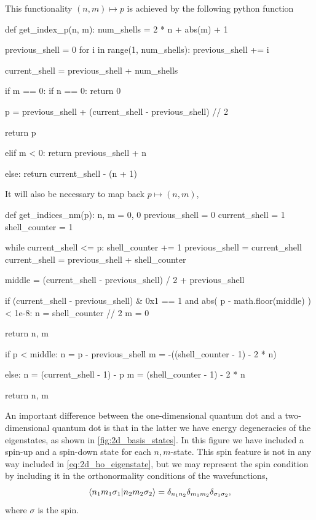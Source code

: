\begin{figure}[h]

\end{figure}

This functionality $(n,m)\mapsto p$ is 
achieved by the following python function
\begin{python}
def get_index_p(n, m):
    num_shells = 2 * n + abs(m) + 1

    previous_shell = 0
    for i in range(1, num_shells):
        previous_shell += i

    current_shell = previous_shell + num_shells

    if m == 0:
        if n == 0:
            return 0

        p = previous_shell + (current_shell - previous_shell) // 2

        return p

    elif m < 0:
        return previous_shell + n

    else:
        return current_shell - (n + 1)
\end{python}
It will also be necessary to map back $p\mapsto(n,m)$,
\begin{python}
def get_indices_nm(p):
    n, m = 0, 0
    previous_shell = 0
    current_shell = 1
    shell_counter = 1

    while current_shell <= p:
        shell_counter += 1
        previous_shell = current_shell
        current_shell = previous_shell + shell_counter

    middle = (current_shell - previous_shell) / 2 + previous_shell

    if (current_shell - previous_shell) & 0x1 == 1 and abs(
        p - math.floor(middle)
    ) < 1e-8:
        n = shell_counter // 2
        m = 0

        return n, m

    if p < middle:
        n = p - previous_shell
        m = -((shell_counter - 1) - 2 * n)

    else:
        n = (current_shell - 1) - p
        m = (shell_counter - 1) - 2 * n

    return n, m
\end{python}

An important difference between the one-dimensional quantum dot and a two-dimensional 
quantum dot is that in the latter we have energy degeneracies of the eigenstates, as shown
in \autoref{fig:2d_basis_states}. In this figure we have included 
a spin-up and a spin-down state for each $n,m$-state. This spin feature is not in any way 
included in \autoref{eq:2d_ho_eigenstate}, but we may represent the spin condition by
including it in the orthonormality conditions of the wavefunctions,
\begin{equation}
    \braket{n_1m_1\sigma_1}{n_2m_2\sigma_2} 
    = \delta_{n_1n_2}\delta_{m_1m_2}\delta_{\sigma_1\sigma_2},
\end{equation}
where $\sigma$ is the spin.

